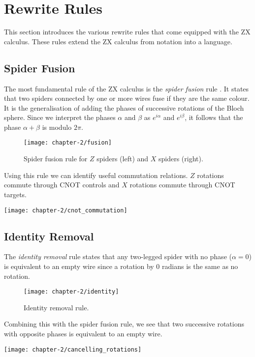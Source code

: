 \section{Rewrite Rules}

This section introduces the various rewrite rules that come equipped with the ZX calculus. These rules extend the ZX calculus from notation into a language.

\subsection{Spider Fusion}
The most fundamental rule of the ZX calculus is the \textit{spider fusion} rule \cite{Wetering2020}. It states that two spiders connected by one or more wires fuse if they are the same colour. It is the generalisation of adding the phases of successive rotations of the Bloch sphere. Since we interpret the phases $\alpha$ and $\beta$ as $e^{i\alpha}$ and $e^{i\beta}$, it follows that the phase $\alpha + \beta$ is modulo $2\pi$.

\begin{figure}[H]
    \centering
    \texttt{[image: chapter-2/fusion]}
    \caption{Spider fusion rule for $Z$ spiders (left) and $X$ spiders (right).}
\end{figure}

Using this rule we can identify useful commutation relations. $Z$ rotations commute through CNOT controls and $X$ rotations commute through CNOT targets.
\begin{center}
\texttt{[image: chapter-2/cnot\_commutation]}
\end{center}


\subsection{Identity Removal}
The \textit{identity removal} rule states that any two-legged spider with no phase ($\alpha = 0$) is equivalent to an empty wire since a rotation by 0 radians is the same as no rotation.
\begin{figure}[H]
    \centering
    \texttt{[image: chapter-2/identity]}
    \caption{Identity removal rule.}
\end{figure}

Combining this with the spider fusion rule, we see that two successive rotations with opposite phases is equivalent to an empty wire.
\begin{center}
\texttt{[image: chapter-2/cancelling\_rotations]}
\end{center}

